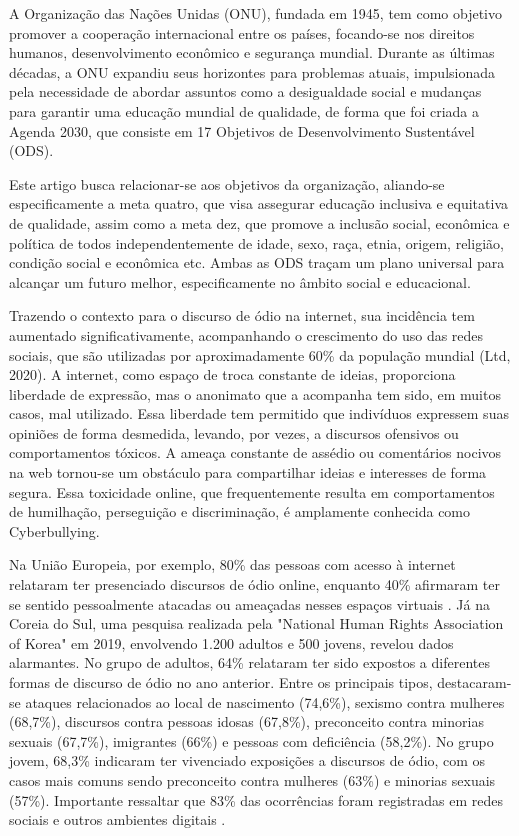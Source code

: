 A Organização das Nações Unidas (ONU), fundada em 1945, tem como objetivo promover a cooperação internacional entre os países, focando-se nos direitos humanos, desenvolvimento econômico e segurança mundial. Durante as últimas décadas, a ONU expandiu seus horizontes para problemas atuais, impulsionada pela necessidade de abordar assuntos como a desigualdade social e mudanças para garantir uma educação mundial de qualidade, de forma que foi criada a Agenda 2030, que consiste em 17 Objetivos de Desenvolvimento Sustentável (ODS).

Este artigo busca relacionar-se aos objetivos da organização, aliando-se especificamente a meta quatro, que visa assegurar educação inclusiva e equitativa de qualidade, assim como a meta dez, que promove a inclusão social, econômica e política de todos independentemente de idade, sexo, raça, etnia, origem, religião, condição social e econômica etc. Ambas as ODS traçam um plano universal para alcançar um futuro melhor, especificamente no âmbito social e educacional.

Trazendo o contexto para o discurso de ódio na internet, sua incidência tem aumentado significativamente, acompanhando o crescimento do uso das redes sociais, que são utilizadas por aproximadamente 60\% da população mundial (Ltd, 2020). A internet, como espaço de troca constante de ideias, proporciona liberdade de expressão, mas o anonimato que a acompanha tem sido, em muitos casos, mal utilizado. Essa liberdade tem permitido que indivíduos expressem suas opiniões de forma desmedida, levando, por vezes, a discursos ofensivos ou comportamentos tóxicos. A ameaça constante de assédio ou comentários nocivos na web tornou-se um obstáculo para compartilhar ideias e interesses de forma segura. Essa toxicidade online, que frequentemente resulta em comportamentos de humilhação, perseguição e discriminação, é amplamente conhecida como Cyberbullying.  

Na União Europeia, por exemplo, 80\% das pessoas com acesso à internet relataram ter presenciado discursos de ódio online, enquanto 40\% afirmaram ter se sentido pessoalmente atacadas ou ameaçadas nesses espaços virtuais \cite{castano2021internet}. Já na Coreia do Sul, uma pesquisa realizada pela "National Human Rights Association of Korea" em 2019, envolvendo 1.200 adultos e 500 jovens, revelou dados alarmantes. No grupo de adultos, 64\% relataram ter sido expostos a diferentes formas de discurso de ódio no ano anterior. Entre os principais tipos, destacaram-se ataques relacionados ao local de nascimento (74,6\%), sexismo contra mulheres (68,7\%), discursos contra pessoas idosas (67,8\%), preconceito contra minorias sexuais (67,7\%), imigrantes (66\%) e pessoas com deficiência (58,2\%). No grupo jovem, 68,3\% indicaram ter vivenciado exposições a discursos de ódio, com os casos mais comuns sendo preconceito contra mulheres (63\%) e minorias sexuais (57\%). Importante ressaltar que 83\% das ocorrências foram registradas em redes sociais e outros ambientes digitais \cite{lee2019report}.

